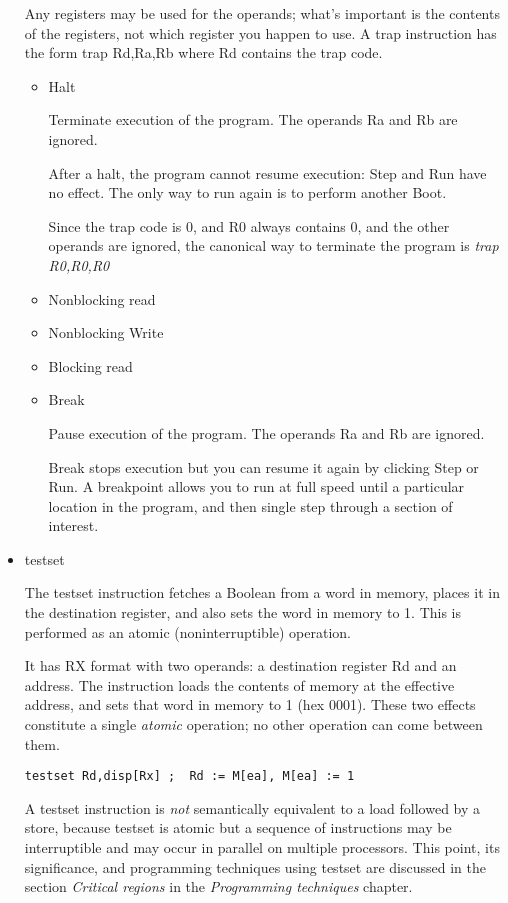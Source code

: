 \documentclass[11pt]{article}
\begin{document}
\begin{itemize}
Any registers may be used for the operands; what's important is the
contents of the registers, not which register you happen to use.  A
trap instruction has the form trap Rd,Ra,Rb where Rd contains the trap
code.

\begin{itemize}
\item Halt
\label{sec:org0e827d4}

Terminate execution of the program.  The operands Ra and Rb are
ignored.

After a halt, the program cannot resume execution: Step and Run have
no effect.  The only way to run again is to perform another Boot.

Since the trap code is 0, and R0 always contains 0, and the other
operands are ignored, the canonical way to terminate the program is
\emph{trap R0,R0,R0}

\item Nonblocking read
\label{sec:org519cc00}

\item Nonblocking Write
\label{sec:org19814b6}

\item Blocking read
\label{sec:org5d084d8}

\item Break
\label{sec:org4efc0da}

Pause execution of the program.  The operands Ra and Rb are ignored.

Break stops execution but you can resume it again by clicking
Step or Run.  A breakpoint allows you to run at full speed until a
particular location in the program, and then single step through a
section of interest.
\end{itemize}

\item testset
\label{sec:org5717e53}

The testset instruction fetches a Boolean from a word in memory,
places it in the destination register, and also sets the word in
memory to 1.  This is performed as an atomic (noninterruptible)
operation.

It has RX format with two operands: a destination register Rd and an
address.  The instruction loads the contents of memory at the
effective address, and sets that word in memory to 1 (hex 0001).
These two effects constitute a single \emph{atomic} operation; no other
operation can come between them.

\begin{verbatim}
testset Rd,disp[Rx] ;  Rd := M[ea], M[ea] := 1
\end{verbatim}

A testset instruction is \emph{not} semantically equivalent to a load
followed by a store, because testset is atomic but a sequence of
instructions may be interruptible and may occur in parallel on
multiple processors.  This point, its significance, and programming
techniques using testset are discussed in the section \emph{Critical
regions} in the \emph{Programming techniques} chapter.
\end{itemize}
\end{document}
